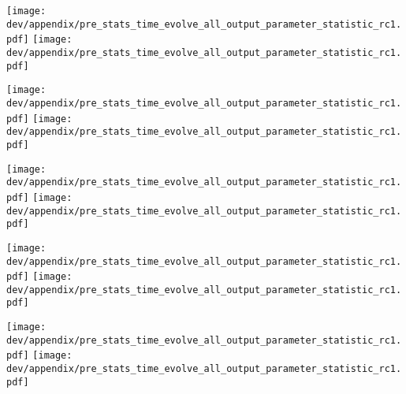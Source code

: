 \begin{sidewaysfigure}[]
\centering
\texttt{[image: dev/appendix/pre\_stats\_time\_evolve\_all\_output\_parameter\_statistic\_rc1.pdf]}
\texttt{[image: dev/appendix/pre\_stats\_time\_evolve\_all\_output\_parameter\_statistic\_rc1.pdf]}
\end{sidewaysfigure}
% 
\begin{sidewaysfigure}[]
\centering
\texttt{[image: dev/appendix/pre\_stats\_time\_evolve\_all\_output\_parameter\_statistic\_rc1.pdf]}
\texttt{[image: dev/appendix/pre\_stats\_time\_evolve\_all\_output\_parameter\_statistic\_rc1.pdf]}
\end{sidewaysfigure}
% 
\begin{sidewaysfigure}[]
\centering
\texttt{[image: dev/appendix/pre\_stats\_time\_evolve\_all\_output\_parameter\_statistic\_rc1.pdf]}
\texttt{[image: dev/appendix/pre\_stats\_time\_evolve\_all\_output\_parameter\_statistic\_rc1.pdf]}
\end{sidewaysfigure}
% 
\begin{sidewaysfigure}[]
\centering
\texttt{[image: dev/appendix/pre\_stats\_time\_evolve\_all\_output\_parameter\_statistic\_rc1.pdf]}
\texttt{[image: dev/appendix/pre\_stats\_time\_evolve\_all\_output\_parameter\_statistic\_rc1.pdf]}
\end{sidewaysfigure}
% 
\begin{sidewaysfigure}[]
\centering
\texttt{[image: dev/appendix/pre\_stats\_time\_evolve\_all\_output\_parameter\_statistic\_rc1.pdf]}
\texttt{[image: dev/appendix/pre\_stats\_time\_evolve\_all\_output\_parameter\_statistic\_rc1.pdf]}
\end{sidewaysfigure}